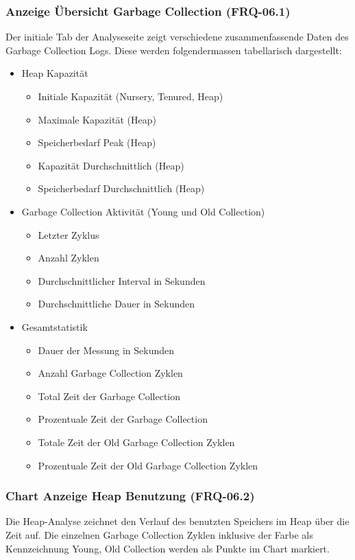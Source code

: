 \subsubsection{Anzeige Übersicht Garbage Collection (FRQ-06.1)}\label{standardreport}
Der initiale Tab der Analyseseite zeigt verschiedene zusammenfassende Daten des Garbage Collection Logs. Diese werden folgendermassen tabellarisch dargestellt:
\begin{itemize}
	\item Heap Kapazität
	\begin{itemize}
		\item Initiale Kapazität (Nursery, Tenured, Heap)
		\item Maximale Kapazität (Heap)
		\item Speicherbedarf Peak (Heap)
		\item Kapazität Durchschnittlich (Heap)
		\item Speicherbedarf Durchschnittlich (Heap)
	\end{itemize}
	\item Garbage Collection Aktivität (Young und Old Collection)
	\begin{itemize}
		\item Letzter Zyklus
		\item Anzahl Zyklen
		\item Durchschnittlicher Interval in Sekunden
		\item Durchschnittliche Dauer in Sekunden		
	\end{itemize}	
	\item Gesamtstatistik
	\begin{itemize}
		\item Dauer der Messung in Sekunden
		\item Anzahl Garbage Collection Zyklen
		\item Total Zeit der Garbage Collection
		\item Prozentuale Zeit der Garbage Collection
		\item Totale Zeit der Old Garbage Collection Zyklen
		\item Prozentuale Zeit der Old Garbage Collection Zyklen
	\end{itemize}
\end{itemize}

\subsubsection{Chart Anzeige Heap Benutzung (FRQ-06.2)}
Die Heap-Analyse zeichnet den Verlauf des benutzten Speichers im Heap über die Zeit auf. Die einzelnen Garbage Collection Zyklen inklusive der Farbe als Kennzeichnung Young, Old Collection werden als Punkte im Chart markiert.

